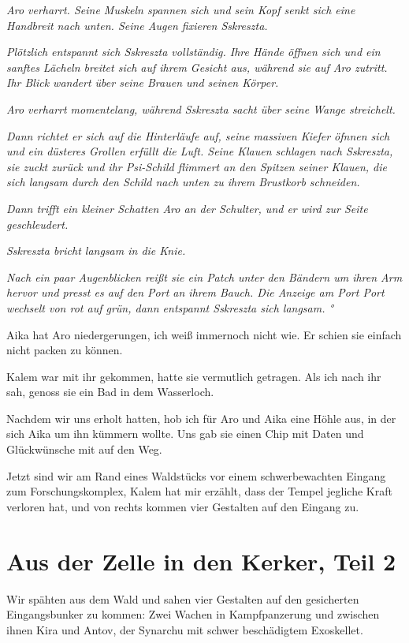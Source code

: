 \documentclass[11pt]{article}
\begin{document}
\emph{Aro verharrt. Seine Muskeln spannen sich und sein Kopf senkt sich
eine Handbreit nach unten. Seine Augen fixieren Sskreszta.}

\emph{Plötzlich entspannt sich Sskreszta vollständig. Ihre Hände öffnen
sich und ein sanftes Lächeln breitet sich auf ihrem Gesicht aus, während
sie auf Aro zutritt. Ihr Blick wandert über seine Brauen und seinen
Körper.}

\emph{Aro verharrt momentelang, während Sskreszta sacht über seine Wange
streichelt.}

\emph{Dann richtet er sich auf die Hinterläufe auf, seine massiven
Kiefer öfnnen sich und ein düsteres Grollen erfüllt die Luft. Seine
Klauen schlagen nach Sskreszta, sie zuckt zurück und ihr Psi-Schild
flimmert an den Spitzen seiner Klauen, die sich langsam durch den Schild
nach unten zu ihrem Brustkorb schneiden.}

\emph{Dann trifft ein kleiner Schatten Aro an der Schulter, und er wird
zur Seite geschleudert.}

\emph{Sskreszta bricht langsam in die Knie.}

\emph{Nach ein paar Augenblicken reißt sie ein Patch unter den Bändern
um ihren Arm hervor und presst es auf den Port an ihrem Bauch. Die
Anzeige am Port Port wechselt von rot auf grün, dann entspannt Sskreszta
sich langsam. °}

Aika hat Aro niedergerungen, ich weiß immernoch nicht wie. Er schien sie
einfach nicht packen zu können.

Kalem war mit ihr gekommen, hatte sie vermutlich getragen. Als ich nach
ihr sah, genoss sie ein Bad in dem Wasserloch.

Nachdem wir uns erholt hatten, hob ich für Aro und Aika eine Höhle aus,
in der sich Aika um ihn kümmern wollte. Uns gab sie einen Chip mit Daten
und Glückwünsche mit auf den Weg.

Jetzt sind wir am Rand eines Waldstücks vor einem schwerbewachten
Eingang zum Forschungskomplex, Kalem hat mir erzählt, dass der Tempel
jegliche Kraft verloren hat, und von rechts kommen vier Gestalten auf
den Eingang zu.

\section{Aus der Zelle in den Kerker, Teil 2}

Wir spähten aus dem Wald und sahen vier Gestalten auf den gesicherten
Eingangsbunker zu kommen: Zwei Wachen in Kampfpanzerung und zwischen
ihnen Kira und Antov, der Synarchu mit schwer beschädigtem Exoskellet.
\end{document}
